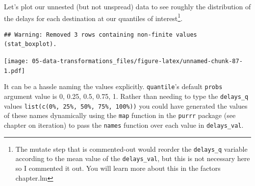 \documentclass[]{book}
\newenvironment{Shaded}{\begin{snugshade}}{\end{snugshade}}
\newcommand{\CommentTok}[1]{\textcolor[rgb]{0.56,0.35,0.01}{\textit{#1}}}
\newcommand{\DataTypeTok}[1]{\textcolor[rgb]{0.13,0.29,0.53}{#1}}
\newcommand{\KeywordTok}[1]{\textcolor[rgb]{0.13,0.29,0.53}{\textbf{#1}}}
\newcommand{\NormalTok}[1]{#1}
\newcommand{\OperatorTok}[1]{\textcolor[rgb]{0.81,0.36,0.00}{\textbf{#1}}}
\newcommand{\StringTok}[1]{\textcolor[rgb]{0.31,0.60,0.02}{#1}}
\let\rmarkdownfootnote\footnote%
\def\footnote{\protect\rmarkdownfootnote}
\theoremstyle{definition}
\theoremstyle{definition}
\theoremstyle{definition}
\theoremstyle{remark}
\begin{document}
Let's plot our unnested (but not unspread) data to see roughly the
distribution of the delays for each destination at our quantiles of
interest\footnote{The mutate step that is commented-out would reorder
  the \texttt{delays\_q} variable according to the mean value of the
  \texttt{delays\_val}, but this is not necessary here so I commented it
  out. You will learn more about this in the factors chapter.lm}.

\begin{Shaded}
\end{Shaded}

\begin{verbatim}
## Warning: Removed 3 rows containing non-finite values (stat_boxplot).
\end{verbatim}

\texttt{[image: 05-data-transformations\_files/figure-latex/unnamed-chunk-87-1.pdf]}

It can be a hassle naming the values explicitly. \texttt{quantile}'s
default \texttt{probs} argument value is 0, 0.25, 0.5, 0.75, 1. Rather
than needing to type the \texttt{delays\_q} values
\texttt{list(c(\textquotesingle{}0\%\textquotesingle{},\ \textquotesingle{}25\%\textquotesingle{},\ \textquotesingle{}50\%\textquotesingle{},\ \textquotesingle{}75\%\textquotesingle{},\ \textquotesingle{}100\%\textquotesingle{}))}
you could have generated the values of these names dynamically using the
\texttt{map} function in the \texttt{purrr} package (see chapter on
iteration) to pass the \texttt{names} function over each value in
\texttt{delays\_val}.
\end{document}

